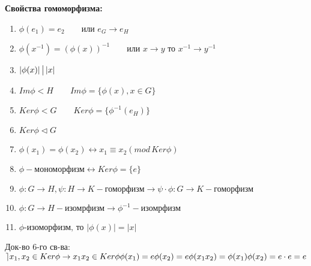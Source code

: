\documentclass[12pt]{article}
\begin{document}
			\hypertarget{inpro:gom}{\textbf{Свойства гомоморфизма:}}
				\begin{enumerate}
					\item $\phi (e_1)=e_2 \qquad \text{или } e_G \rightarrow e_H$
					\item $\phi (x^{-1})=(\phi (x))^{-1} \qquad \text{или } x\rightarrow y  \text{ то } x^{-1}\rightarrow y^{-1}$
					\item $| \phi (x)|\, \big{|} \, |x|$
					\item $Im\phi < H \qquad Im\phi=\{ \phi (x), x\in G \}$
					\item $Ker\phi <G  \qquad  Ker \phi=\{ \phi^{-1}(e_H) \}$
					\item $Ker\phi \lhd G$
					\item $\phi (x_1)=\phi (x_2) \leftrightarrow x_1 \equiv x_2 (mod \, Ker\phi) $
					\item $\phi- \text{мономорфизм}\leftrightarrow Ker \phi =\{e\} $
					\item $\phi :G \rightarrow H, \psi :H\rightarrow K -\text{гоморфизм} \rightarrow \psi \cdot \phi : G \rightarrow K - \text{гоморфизм}$
					\item $\phi :G\rightarrow H-\text{изомрфизм} \rightarrow \phi^{-1}-\text{изомрфизм} $
					\item $\phi \text{-изоморфизм, то } |\phi (x)|=|x|$
				\end{enumerate}
				
			Док-во 6-го св-ва:$\rceil x_1, x_2 \in Ker\phi \rightarrow x_1 x_2 \in Ker\phi \\
			\phi (x_1)=e \\
			\phi (x_2)=e \\
			\phi (x_1x_2)=\phi (x_1) \phi (x_2)=e\cdot e=e$
			
			
		
		
\end{document}
